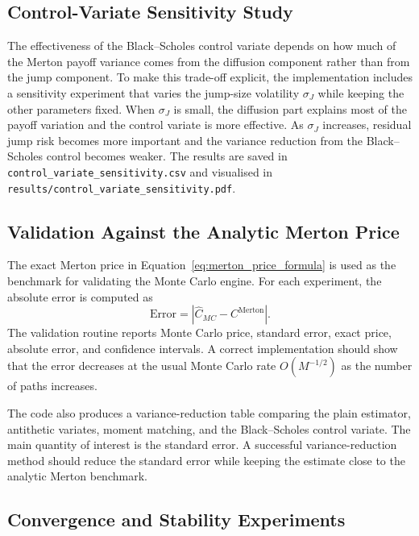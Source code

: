 \documentclass[12pt]{article}
\begin{document}
\subsection*{Control-Variate Sensitivity Study}

The effectiveness of the Black--Scholes control variate depends on how much of the Merton payoff variance comes from the diffusion component rather than from the jump component. To make this trade-off explicit, the implementation includes a sensitivity experiment that varies the jump-size volatility $\sigma_J$ while keeping the other parameters fixed. When $\sigma_J$ is small, the diffusion part explains most of the payoff variation and the control variate is more effective. As $\sigma_J$ increases, residual jump risk becomes more important and the variance reduction from the Black--Scholes control becomes weaker. The results are saved in \texttt{control\_variate\_sensitivity.csv} and visualised in \texttt{results/control\_variate\_sensitivity.pdf}.

\subsection*{Validation Against the Analytic Merton Price}

The exact Merton price in Equation~\eqref{eq:merton_price_formula} is used as the benchmark for validating the Monte Carlo engine. For each experiment, the absolute error is computed as
\begin{equation}
\mathrm{Error}=\left|\widehat{C}_{MC}-C^{\mathrm{Merton}}\right|.
\label{eq:w3_mc_error}
\end{equation}
The validation routine reports Monte Carlo price, standard error, exact price, absolute error, and confidence intervals. A correct implementation should show that the error decreases at the usual Monte Carlo rate $O(M^{-1/2})$ as the number of paths increases.

The code also produces a variance-reduction table comparing the plain estimator, antithetic variates, moment matching, and the Black--Scholes control variate. The main quantity of interest is the standard error. A successful variance-reduction method should reduce the standard error while keeping the estimate close to the analytic Merton benchmark.

\subsection*{Convergence and Stability Experiments}
\end{document}
